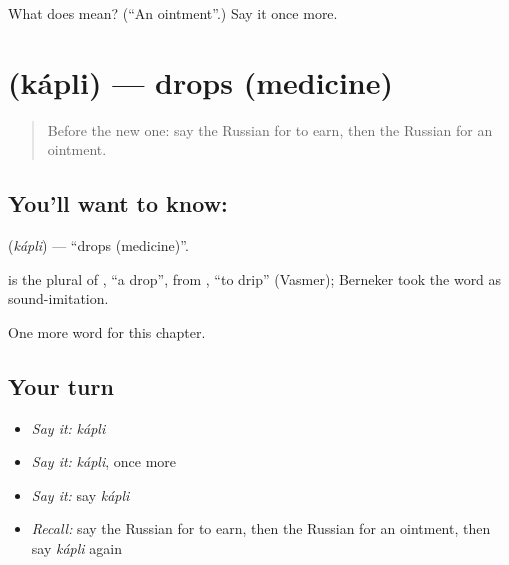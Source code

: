 \begin{tcolorbox}[breakable,colback=teal!4,colframe=teal!35!black,title={Before you move on}]
What does  mean? (\textquotedblleft{}An ointment\textquotedblright{}.) Say it once more.
\end{tcolorbox}
\section[\texorpdfstring{\ru{капли} (kápli)}{капли (kápli)}]{ (kápli) — drops (medicine)}

\label{lesson:RU-C238-kapli}



\begin{quote}
Before the new one: say the Russian for to earn, then the Russian for an ointment.
\end{quote}

\subsection*{You'll want to know: }
\textbf{} (\emph{kápli}) — \textquotedblleft{}drops (medicine)\textquotedblright{}.

\begin{cousinweb}
\textbf{} is the plural of \emph{}, \textquotedblleft{}a drop\textquotedblright{}, from \emph{}, \textquotedblleft{}to drip\textquotedblright{} (Vasmer); Berneker took the word as sound-imitation.
\end{cousinweb}

\begin{grammarlens}[title={What you've built}]
One more word for this chapter.
\end{grammarlens}

\subsection*{Your turn}
\begin{itemize}
\raggedright
  \item \emph{Say it:} \emph{kápli}
  \item \emph{Say it:} \emph{kápli}, once more
  \item \emph{Say it:} say \emph{kápli}
  \item \emph{Recall:} say the Russian for to earn, then the Russian for an ointment, then say \emph{kápli} again
\end{itemize}

